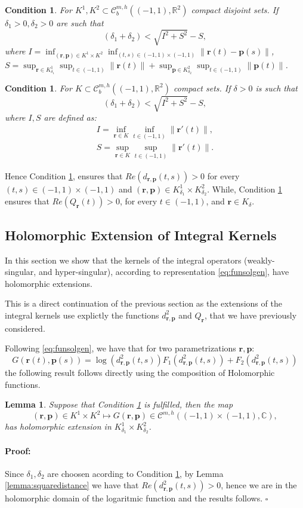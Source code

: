\documentclass{article}
\newtheorem{lemma}[theorem]{Lemma}
\newtheorem{condition}[theorem]{Condition}
\newenvironment{proof}{\paragraph{Proof:}}{\hfill$\square$}
\newcommand{\IC}{{\mathbb C}}
\newcommand{\IR}{{\mathbb R}}
\newcommand{\bp}{{\bm p}}
\newcommand{\cmspaceh}[4]{\mathcal{C}^{#1,#2} \left( #3, #4 \right)}
\newcommand{\rgeoh}[2]{\mathcal{C}_b^{#1,#2}\left( (-1,1), \IR^2 \right)}
\newcommand{\br}{\bm{r}}
\newcommand{\iinterv}{(-1,1)\times(-1,1)}
\begin{document}
\begin{condition}
\label{condition:dcross}
For $K^1,K^2 \subset \rgeoh{m}{h}$ compact disjoint sets. If $\delta_1>0,\delta_2>0$ are such that 
$$
(\delta_1 + \delta_2) < \sqrt{I^2+S^2}-S,
$$
where $I=\inf_{(\br,\bp) \in K^1 \times K^2} \inf_{(t,s) \in (-1,1)\times(-1,1)}
 \| \br(t) - \bp(s) \|$, $S = \sup_{\br \in K^1_{\delta_1}} \sup_{t \in (-1,1)} \| \br(t)\| +
\sup_{\bp \in K^2_{\delta_2}} \sup_{t \in (-1,1)} \| \bp(t)\|$. 
\end{condition}

\begin{condition}
\label{condition:Qself}
For $K \subset \rgeoh{m}{h}$ compact  sets. If $\delta>0 $ is such that 
$$
(\delta_1 + \delta_2) < \sqrt{I^2+S^2}-S,
$$
where $I,S$ are defined as:
\begin{align*}
 I = \inf_{\br \in K} \inf_{t \in (-1,1)} \| \br'(t)\|,\\
 S = \sup_{\br \in K} \sup_{t \in (-1,1)} \|\br'(t)\|.
\end{align*} 
\end{condition}
Hence Condition \ref{condition:dcross}, ensures that $Re(d_{\br,\bp}(t,s))>0$ for every $(t,s) \in \iinterv$ and $(\br,\bp) \in K^1_{\delta_1} \times K^2_{\delta_2}$. While, Condition \ref{condition:Qself} ensures that $Re(Q_{\br}(t)) >0$, for every $t \in (-1,1)$, and $\br \in K_\delta$. 

\subsection{Holomorphic Extension of Integral Kernels}
In this section we show that the kernels of the integral operators (weakly-singular, and hyper-singular), according to representation \eqref{eq:funsolgen}, have holomorphic extensions. 

This is a direct continuation of the previous section as the extensions of the integral kernels use explictly the functions $d_{\br,\bp}^2$ and $Q_{\br}$, that we have previously considered.

Following \eqref{eq:funsolgen}, we have that for two parametrizations $\br,\bp$: 
$$
G(\br(t),\bp(s)) = \log(d^2_{\br,\bp}(t,s)) F_1(d^2_{\br,\bp}(t,s))+F_2(d^2_{\br,\bp}(t,s))
$$
the following result follows directly using the composition of Holomorphic functions. 
\begin{lemma}
\label{lemma:crosskernel}
Suppose that Condition \ref{condition:dcross} is fulfilled, then the map 
$$
(\br,\bp) \in K^1 \times K^2 \mapsto G(\br,\bp) \in \cmspaceh{m}{h}{\iinterv}{\IC},
$$
has holomorphic extension in $K^1_{\delta_1} \times K^2_{\delta_2}$.
\end{lemma}
\begin{proof}
Since $\delta_1,\delta_2$ are choosen acording to Condition \ref{condition:dcross}, by Lemma \ref{lemma:squaredistance} we have that $Re(d_{\br,\bp}^2(t,s)) >0$, hence we are in the holomorphic domain of the logaritmic function and the results follows. 
\end{proof}
\end{document}
